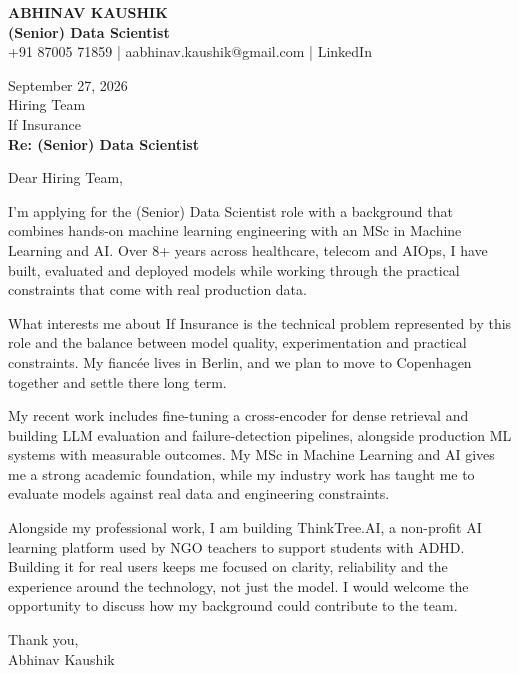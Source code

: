 \documentclass[10pt,a4paper]{article}
\begin{document}
\begin{center}
{\Large\bfseries ABHINAV KAUSHIK}\\[2pt]
{\bfseries (Senior) Data Scientist}\\[2pt]
+91 87005 71859 \quad | \quad aabhinav.kaushik@gmail.com \quad | \quad LinkedIn
\end{center}
\vspace{8pt}
September 27, 2026\\[6pt]
Hiring Team\\
If Insurance\\[4pt]
\textbf{Re: (Senior) Data Scientist}

Dear Hiring Team,

I’m applying for the (Senior) Data Scientist role with a background that combines hands-on machine learning engineering with an MSc in Machine Learning and AI. Over 8+ years across healthcare, telecom and AIOps, I have built, evaluated and deployed models while working through the practical constraints that come with real production data.

What interests me about If Insurance is the technical problem represented by this role and the balance between model quality, experimentation and practical constraints. My fiancée lives in Berlin, and we plan to move to Copenhagen together and settle there long term.

My recent work includes fine-tuning a cross-encoder for dense retrieval and building LLM evaluation and failure-detection pipelines, alongside production ML systems with measurable outcomes. My MSc in Machine Learning and AI gives me a strong academic foundation, while my industry work has taught me to evaluate models against real data and engineering constraints.

Alongside my professional work, I am building ThinkTree.AI, a non-profit AI learning platform used by NGO teachers to support students with ADHD. Building it for real users keeps me focused on clarity, reliability and the experience around the technology, not just the model. I would welcome the opportunity to discuss how my background could contribute to the team.

Thank you,\\
Abhinav Kaushik
\end{document}
